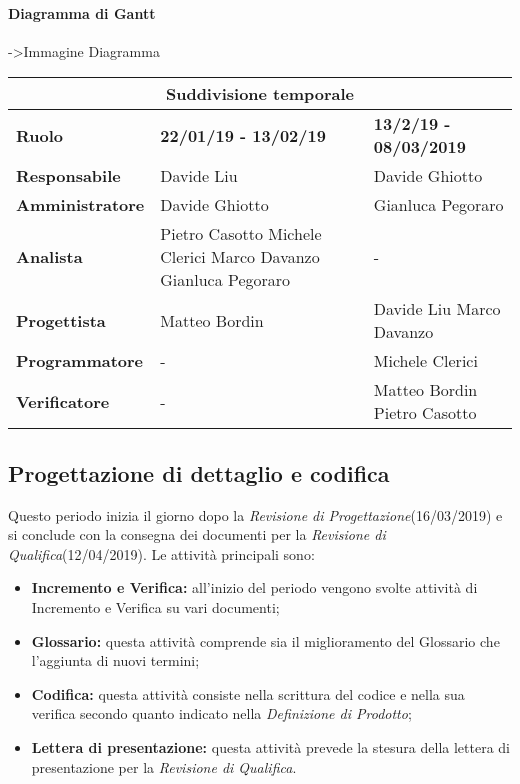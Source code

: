 	\paragraph{Diagramma di Gantt}
	->Immagine Diagramma
	
	\begin{tabular}{|l|l|l|}
		\hline
		\multicolumn{3}{|c|}{\textbf{Suddivisione temporale}}\\
		\hline
		\textbf{Ruolo} & \textbf{22/01/19 - 13/02/19} & \textbf{13/2/19 - 08/03/2019} \\
		\hline
		\textbf{Responsabile} & Davide Liu & Davide Ghiotto \\
		\hline
		\textbf{Amministratore} & Davide Ghiotto & Gianluca Pegoraro \\
		\hline
		\textbf{Analista} & Pietro Casotto Michele Clerici Marco Davanzo Gianluca Pegoraro & - \\
		\hline
		\textbf{Progettista} & Matteo Bordin & Davide Liu Marco Davanzo \\
		\hline
		\textbf{Programmatore} & - & Michele Clerici \\
		\hline
		\textbf{Verificatore} & - & Matteo Bordin Pietro Casotto \\
		\hline
	\end{tabular}

	\subsection{Progettazione di dettaglio e codifica}
	Questo periodo inizia il giorno dopo la \textit{Revisione di Progettazione}(16/03/2019) e si conclude
	con la consegna dei documenti per la \textit{Revisione di Qualifica}(12/04/2019). Le attività principali sono:
	\begin{itemize}
		\item{\textbf{Incremento e Verifica:} all’inizio del periodo vengono svolte attività di Incremento e Verifica su vari documenti;}
		\item{\textbf{Glossario:} questa attività comprende sia il miglioramento del Glossario che l’aggiunta di nuovi termini;}
		\item{\textbf{Codifica:} questa attività consiste nella scrittura del codice e nella sua verifica secondo quanto indicato nella \textit{Definizione di Prodotto};}
		\item{\textbf{Lettera di presentazione:} questa attività prevede la stesura della lettera
	di presentazione per la \textit{Revisione di Qualifica}.}
	\end{itemize}

